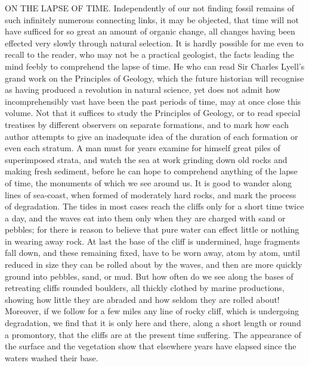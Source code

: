 ON THE LAPSE OF TIME.
Independently of our not finding fossil remains of such infinitely numerous connecting links, it may be objected, that time will not have sufficed for so great an amount of organic change, all changes having been effected very slowly through natural selection. It is hardly possible for me even to recall to the reader, who may not be a practical geologist, the facts leading the mind feebly to comprehend the lapse of time. He who can read Sir Charles Lyell's grand work on the Principles of Geology, which the future historian will recognise as having produced a revolution in natural science, yet does not admit how incomprehensibly vast have been the past periods of time, may at once close this volume. Not that it suffices to study the Principles of Geology, or to read special treatises by different observers on separate formations, and to mark how each author attempts to give an inadequate idea of the duration of each formation or even each stratum. A man must for years examine for himself great piles of superimposed strata, and watch the sea at work grinding down old rocks and making fresh sediment, before he can hope to comprehend anything of the lapse of time, the monuments of which we see around us.
It is good to wander along lines of sea-coast, when formed of moderately hard rocks, and mark the process of degradation. The tides in most cases reach the cliffs only for a short time twice a day, and the waves eat into them only when they are charged with sand or pebbles; for there is reason to believe that pure water can effect little or nothing in wearing away rock. At last the base of the cliff is undermined, huge fragments fall down, and these remaining fixed, have to be worn away, atom by atom, until reduced in size they can be rolled about by the waves, and then are more quickly ground into pebbles, sand, or mud. But how often do we see along the bases of retreating cliffs rounded boulders, all thickly clothed by marine productions, showing how little they are abraded and how seldom they are rolled about! Moreover, if we follow for a few miles any line of rocky cliff, which is undergoing degradation, we find that it is only here and there, along a short length or round a promontory, that the cliffs are at the present time suffering. The appearance of the surface and the vegetation show that elsewhere years have elapsed since the waters washed their base.
